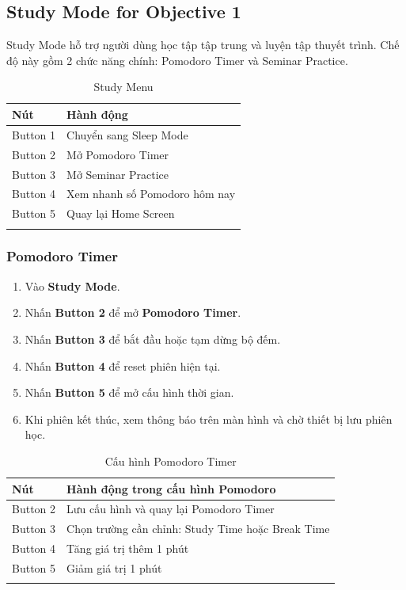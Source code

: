 \documentclass[12pt,a4paper]{article}
\begin{document}
\subsection{Study Mode for Objective 1}

Study Mode hỗ trợ người dùng học tập tập trung và luyện tập thuyết trình. Chế độ này gồm 2 chức năng chính: Pomodoro Timer và Seminar Practice.

\begin{longtable}{|P{3cm}|P{11.5cm}|}
\hline
\textbf{Nút} & \textbf{Hành động} \\
\hline
Button 1 & Chuyển sang Sleep Mode \\
\hline
Button 2 & Mở Pomodoro Timer \\
\hline
Button 3 & Mở Seminar Practice \\
\hline
Button 4 & Xem nhanh số Pomodoro hôm nay \\
\hline
Button 5 & Quay lại Home Screen \\
\hline
\caption{Study Menu}
\end{longtable}

\subsubsection{Pomodoro Timer}

\begin{enumerate}
    \item Vào \textbf{Study Mode}.
    \item Nhấn \textbf{Button 2} để mở \textbf{Pomodoro Timer}.
    \item Nhấn \textbf{Button 3} để bắt đầu hoặc tạm dừng bộ đếm.
    \item Nhấn \textbf{Button 4} để reset phiên hiện tại.
    \item Nhấn \textbf{Button 5} để mở cấu hình thời gian.
    \item Khi phiên kết thúc, xem thông báo trên màn hình và chờ thiết bị lưu phiên học.
\end{enumerate}

\begin{longtable}{|P{3cm}|P{11.5cm}|}
\hline
\textbf{Nút} & \textbf{Hành động trong cấu hình Pomodoro} \\
\hline
Button 2 & Lưu cấu hình và quay lại Pomodoro Timer \\
\hline
Button 3 & Chọn trường cần chỉnh: Study Time hoặc Break Time \\
\hline
Button 4 & Tăng giá trị thêm 1 phút \\
\hline
Button 5 & Giảm giá trị 1 phút \\
\hline
\caption{Cấu hình Pomodoro Timer}
\end{longtable}
\end{document}
